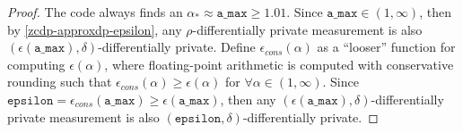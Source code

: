 \documentclass{article}
\begin{document}
\begin{proof}
The code always finds an $\alpha_{*} \approx \texttt{a\_max} \geq 1.01$.
Since $\texttt{a\_max} \in (1, \infty)$, then by \ref{zcdp-approxdp-epsilon}, any $\rho$-differentially private measurement is also $(\epsilon(\texttt{a\_max}), \delta)$-differentially private.
Define $\epsilon_{cons}(\alpha)$ as a ``looser'' function for computing $\epsilon(\alpha)$, 
where floating-point arithmetic is computed with conservative rounding such that $\epsilon_{cons}(\alpha) \geq \epsilon(\alpha)$ for $\forall \alpha \in (1, \infty)$.
Since $\texttt{epsilon} = \epsilon_{cons}(\texttt{a\_max}) \geq \epsilon(\texttt{a\_max})$, then any $(\epsilon(\texttt{a\_max}), \delta)$-differentially private measurement is also $(\texttt{epsilon}, \delta)$-differentially private.
\end{proof}




\end{document}
